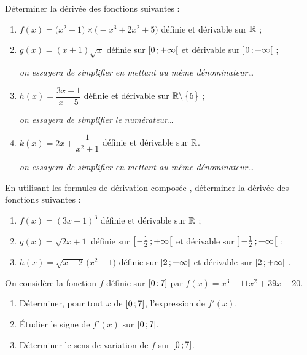 \documentclass[a4paper,11pt]{article}
\begin{document}
\medskip


\medskip

Déterminer la dérivée des fonctions suivantes :

\begin{enumerate}
	\item $f(x)=\big(x^2+1\big) \times \big(-x^3+2x^2+5\big)$ définie et dérivable sur $\R$ ;
	\item $g(x)=(x+1)\sqrt{x}$ définie sur $\mbox{\ensuremath{\left[0\mathpunct{};+\infty\right[}}$ et dérivable sur $\mbox{\ensuremath{\left]0\mathpunct{};+\infty\right[}}$ ;
	
	\textit{\footnotesize \faHandPointRight[regular] \small on essayera de simplifier en mettant au même dénominateur\ldots}
	\item $h(x)=\dfrac{3x+1}{x-5} $ définie et dérivable sur $\R \backslash \left\lbrace \strut 5 \right\rbrace$ ;
	
	\textit{\footnotesize \faHandPointRight[regular] \small on essayera de simplifier le numérateur\ldots}
	\item $k(x)=2x+\dfrac{1}{x^2+1}$ définie et dérivable sur $\R$.
	
	\textit{\footnotesize \faHandPointRight[regular] \small on essayera de simplifier en mettant au même dénominateur\ldots}
\end{enumerate}

\medskip


\medskip

En utilisant les formules de \og dérivation composée \fg, déterminer la dérivée des fonctions suivantes :
\begin{enumerate}
	\item $f(x)=(3x+1)^3$ définie et dérivable sur $\R$ ;
	\item $g(x)=\sqrt{2x+1}$ définie sur $\mbox{\ensuremath{\left[-\tfrac{1}{2}\mathpunct{};+\infty\right[}}$ et dérivable sur $\mbox{\ensuremath{\left]-\tfrac{1}{2}\mathpunct{};+\infty\right[}}$ ;
	\item $h(x)=\sqrt{x-2}\,\big(x^2-1\big)$ définie sur $\mbox{\ensuremath{\left[2\mathpunct{};+\infty\right[}}$ et dérivable sur $\mbox{\ensuremath{\left]2\mathpunct{};+\infty\right[}}$ .
\end{enumerate}

\medskip


\medskip

On considère la fonction $f$ définie sur $\mbox{\ensuremath{\left[0\mathpunct{};7\right]}}$ par $f(x)=x^3-11x^2+39x-20$.

\begin{enumerate}
	\item Déterminer, pour tout $x$ de $\mbox{\ensuremath{\left[0\mathpunct{};7\right]}}$, l'expression de $f'(x)$.
	\item Étudier le signe de $f'(x)$ sur $\mbox{\ensuremath{\left[0\mathpunct{};7\right]}}$.
	\item Déterminer le sens de variation de $f$ sur $\mbox{\ensuremath{\left[0\mathpunct{};7\right]}}$.
\end{enumerate}
\end{document}
